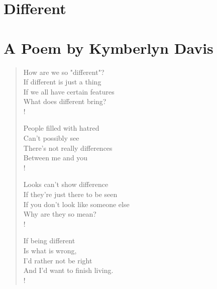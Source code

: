 \documentclass[10pt]{report}
\newcommand{\fbd}{
    \setlength{\fboxsep}{0pt}
    \setlength{\fboxrule}{3pt}
  }
\begin{document}

\chapter*{%
  \huge Different\\
  \small \;\\ A Poem by Kymberlyn Davis
}

\begin{verse}

\begin{altverse}
How are we so "different"?\\
  If different is just a thing\\
If we all have certain features\\
  What does different bring?\\!


People filled with hatred\\
  Can't possibly see\\
There's not really differences\\
  Between me and you\\!

  
Looks can't show difference\\
  If they're just there to be seen\\
If you don't look like someone else\\
  Why are they so mean?\\!


If being different\\
  Is what is wrong,\\
I'd rather not be right\\
  And I'd want to finish living.\\!    
\end{altverse}
\end{verse}

\begin{center}
    \tiny \;\\\;\\{%
      \fbd
    }
\end{center}

\clearpage


\end{document}
